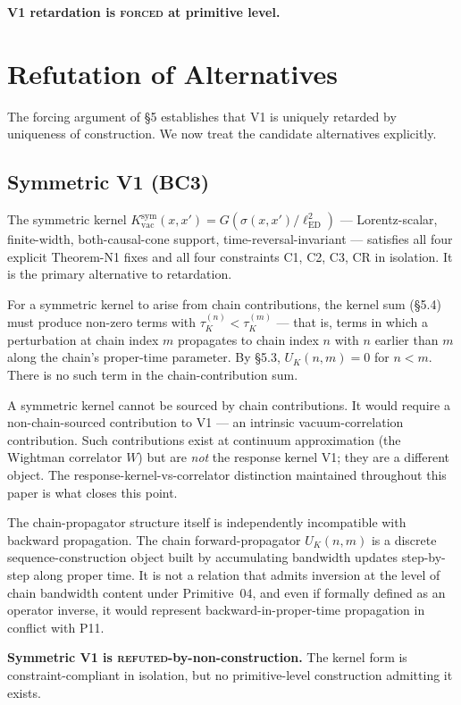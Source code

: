 \documentclass[11pt,a4paper]{article}
\begin{document}
\textbf{V1 retardation is \textsc{forced} at primitive level.}

\section{Refutation of Alternatives}

The forcing argument of \S5 establishes that V1 is uniquely retarded by uniqueness of construction. We now treat the candidate alternatives explicitly.

\subsection{Symmetric V1 (BC3)}

The symmetric kernel $K_\mathrm{vac}^\mathrm{sym}(x, x') = G(\sigma(x, x') / \ell_\mathrm{ED}^2)$ --- Lorentz-scalar, finite-width, both-causal-cone support, time-reversal-invariant --- satisfies all four explicit Theorem-N1 fixes and all four constraints C1, C2, C3, CR in isolation. It is the primary alternative to retardation.

For a symmetric kernel to arise from chain contributions, the kernel sum (\S5.4) must produce non-zero terms with $\tau_K^{(n)} < \tau_K^{(m)}$ --- that is, terms in which a perturbation at chain index $m$ propagates to chain index $n$ with $n$ earlier than $m$ along the chain's proper-time parameter. By \S5.3, $U_K(n, m) = 0$ for $n < m$. There is no such term in the chain-contribution sum.

A symmetric kernel cannot be sourced by chain contributions. It would require a non-chain-sourced contribution to V1 --- an intrinsic vacuum-correlation contribution. Such contributions exist at continuum approximation (the Wightman correlator $W$) but are \emph{not} the response kernel V1; they are a different object. The response-kernel-vs-correlator distinction maintained throughout this paper is what closes this point.

The chain-propagator structure itself is independently incompatible with backward propagation. The chain forward-propagator $U_K(n, m)$ is a discrete sequence-construction object built by accumulating bandwidth updates step-by-step along proper time. It is not a relation that admits inversion at the level of chain bandwidth content under Primitive~04, and even if formally defined as an operator inverse, it would represent backward-in-proper-time propagation in conflict with P11.

\textbf{Symmetric V1 is \textsc{refuted}-by-non-construction.} The kernel form is constraint-compliant in isolation, but no primitive-level construction admitting it exists.
\end{document}
